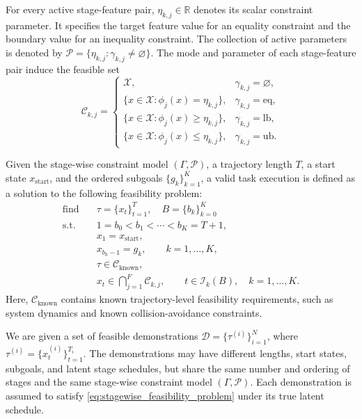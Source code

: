 For every active stage-feature pair, $\eta_{k,j}\in\mathbb{R}$ denotes its scalar constraint parameter. It specifies the target feature value for an equality constraint and the boundary value for an inequality constraint. The collection of active parameters is denoted by $\mathcal{P}=\{\eta_{k,j}:\gamma_{k,j}\neq\varnothing\}$. The mode and parameter of each stage-feature pair induce the feasible set
\begin{equation}
\mathcal{C}_{k,j}
=
\begin{cases}
\mathcal{X},
& \gamma_{k,j}=\varnothing,\\
\{x\in\mathcal{X}:\phi_j(x)=\eta_{k,j}\},
& \gamma_{k,j}=\mathrm{eq},\\
\{x\in\mathcal{X}:\phi_j(x)\geq\eta_{k,j}\},
& \gamma_{k,j}=\mathrm{lb},\\
\{x\in\mathcal{X}:\phi_j(x)\leq\eta_{k,j}\},
& \gamma_{k,j}=\mathrm{ub}.
\end{cases}
\label{eq:stage_feature_feasible_set}
\end{equation}

Given the stage-wise constraint model $(\Gamma,\mathcal{P})$, a trajectory length $T$, a start state $x_{\mathrm{start}}$, and the ordered subgoals $\{g_k\}_{k=1}^{K}$, a valid task execution is defined as a solution to the following feasibility problem:
\begin{equation}
\begin{aligned}
\text{find}\quad
& \tau=\{x_t\}_{t=1}^{T},\quad B=\{b_k\}_{k=0}^{K} \\
\text{s.t.}\quad
& 1=b_0<b_1<\cdots<b_K=T+1,\\
& x_1=x_{\mathrm{start}},\\
& x_{b_k-1}=g_k,
\qquad k=1,\dots,K,\\
& \tau\in\mathcal{C}_{\mathrm{known}},\\
& x_t\in\bigcap_{j=1}^{F}\mathcal{C}_{k,j},
\qquad
t\in\mathcal{I}_k(B),\quad k=1,\dots,K.
\end{aligned}
\label{eq:stagewise_feasibility_problem}
\end{equation}
Here, $\mathcal{C}_{\mathrm{known}}$ contains known trajectory-level feasibility requirements, such as system dynamics and known collision-avoidance constraints.

We are given a set of feasible demonstrations $\mathcal{D}=\{\tau^{(i)}\}_{i=1}^{N}$, where $\tau^{(i)}=\{x_t^{(i)}\}_{t=1}^{T_i}$. The demonstrations may have different lengths, start states, subgoals, and latent stage schedules, but share the same number and ordering of stages and the same stage-wise constraint model $(\Gamma,\mathcal{P})$. Each demonstration is assumed to satisfy \eqref{eq:stagewise_feasibility_problem} under its true latent schedule.


